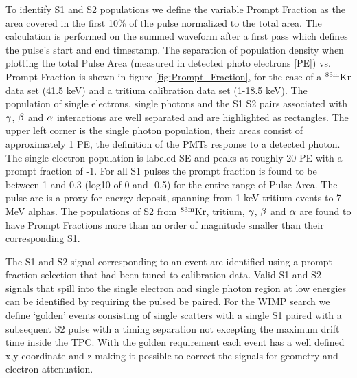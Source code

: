 To identify S1 and S2 populations we define the variable Prompt Fraction as the area covered in the first 10\% of the pulse normalized to the total area. The calculation is performed on the summed waveform after a first pass which defines the pulse's start and end timestamp. 
The separation of population density when plotting the total Pulse Area (measured in detected photo electrons [PE]) vs. Prompt Fraction is shown in figure \ref{fig:Prompt_Fraction},  for the case of a $\rm ^{83m}Kr$ data set (41.5 keV) and a tritium calibration data set (1-18.5 keV). The population of single electrons, single photons and the S1 S2 pairs associated with $\rm \gamma$, $\rm \beta$ and $\rm \alpha$ interactions are well separated and are highlighted as rectangles. The upper left corner is the single photon population, their areas consist of approximately 1 PE, the definition of the PMTs response to a detected photon. The single electron population is labeled SE and peaks at roughly 20 PE with a prompt fraction of -1. For all S1 pulses the prompt fraction is found to be between 1 and 0.3 (log10 of 0 and -0.5) for the entire range of Pulse Area. The pulse are is a proxy for energy deposit, spanning from 1 keV tritium events to 7 MeV alphas. The populations of S2 from $\rm^{83m}Kr$, tritium, $\rm \gamma$, $\rm \beta$ and $\rm \alpha$ are found to have Prompt Fractions more than an order of magnitude smaller than their corresponding S1. 


The S1 and S2 signal corresponding to an event are identified using a prompt fraction selection that had been tuned to calibration data. Valid S1 and S2 signals that spill into the single electron and single photon region at low energies can be identified by requiring the pulsed be paired. For the WIMP search we define `golden' events consisting of single scatters with a single S1 paired with a subsequent S2 pulse with a timing separation not excepting the maximum drift time inside the TPC. With the golden requirement each event has a well defined x,y coordinate and z making it possible to correct the signals for geometry and electron attenuation. 


